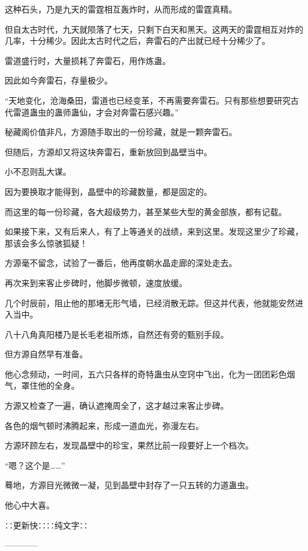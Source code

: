 \begin{this_body}
这种石头，乃是九天的雷霆相互轰炸时，从而形成的雷霆真精。

但自太古时代，九天就陨落了七天，只剩下白天和黑天。这两天的雷霆相互对炸的几率，十分稀少。因此太古时代之后，奔雷石的产出就已经十分稀少了。

雷道盛行时，大量损耗了奔雷石，用作炼蛊。

因此如今奔雷石，存量极少。

“天地变化，沧海桑田，雷道也已经变革，不再需要奔雷石。只有那些想要研究古代雷道蛊虫的蛊师蛊仙，才会对奔雷石感兴趣。”

秘藏阁价值非凡，方源随手取出的一份珍藏，就是一颗奔雷石。

但随后，方源却又将这块奔雷石，重新放回到晶壁当中。

小不忍则乱大谋。

因为要换取才能得到，晶壁中的珍藏数量，都是固定的。

而这里的每一份珍藏，各大超级势力，甚至某些大型的黄金部族，都有记载。

如果接下来，又有后来人，有了上等通关的战绩，来到这里。发现这里少了珍藏，那该会多么惊骇狐疑！

方源毫不留念，试验了一番后，他再度朝水晶走廊的深处走去。

再次来到来客止步碑时，他脚步微顿，速度放缓。

几个时辰前，阻止他的那堵无形气墙，已经消散无踪。但这并代表，他就能安然进入当中。

八十八角真阳楼乃是长毛老祖所炼，自然还有旁的甄别手段。

但方源自然早有准备。

他心念频动，一时间，五六只各样的奇特蛊虫从空窍中飞出，化为一团团彩色烟气，罩住他的全身。

方源又检查了一遍，确认遮掩周全了，这才越过来客止步碑。

各色的烟气顿时沸腾起来，形成一道血光，弥漫左右。

方源环顾左右，发现晶壁中的珍宝，果然比前一段要好上一个档次。

“嗯？这个是……”

蓦地，方源目光微微一凝，见到晶壁中封存了一只五转的力道蛊虫。

他心中大喜。

∷更新快∷∷纯文字∷

------------

\end{this_body}

